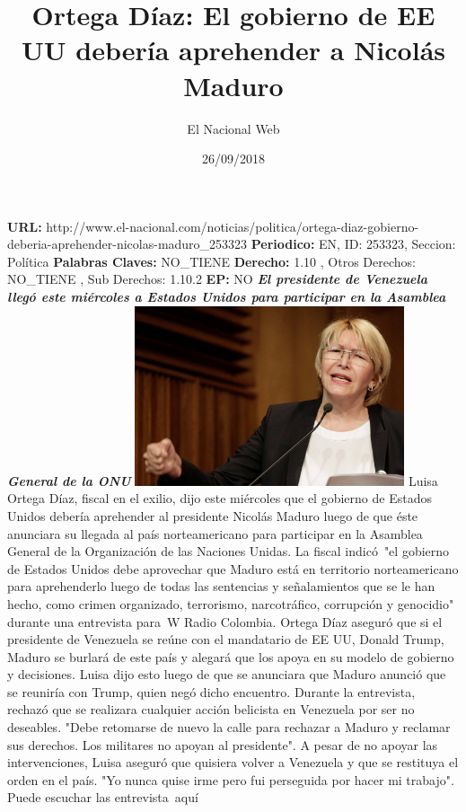 \documentclass{article}%
\title{\textbf{Ortega Díaz: El gobierno de EE UU debería aprehender a Nicolás Maduro}}%
\author{El Nacional Web}%
\date{26/09/2018}%
\begin{document}
%
\normalsize%
\maketitle%
\textbf{URL: }%
http://www.el{-}nacional.com/noticias/politica/ortega{-}diaz{-}gobierno{-}deberia{-}aprehender{-}nicolas{-}maduro\_253323\newline%
%
\textbf{Periodico: }%
EN, %
ID: %
253323, %
Seccion: %
Política\newline%
%
\textbf{Palabras Claves: }%
NO\_TIENE\newline%
%
\textbf{Derecho: }%
1.10%
, Otros Derechos: %
NO\_TIENE%
, Sub Derechos: %
1.10.2%
\newline%
%
\textbf{EP: }%
NO\newline%
\newline%
%
\textbf{\textit{El presidente de Venezuela llegó este miércoles a Estados Unidos para participar en la Asamblea General de la ONU}}%
\newline%
\newline%
%
\includegraphics[width=300px]{257.jpg}%
\newline%
%
Luisa Ortega Díaz, fiscal en el exilio, dijo este miércoles que el gobierno de Estados Unidos debería aprehender al presidente Nicolás Maduro luego de que éste anunciara su llegada al país norteamericano para participar en la Asamblea General de la Organización de las Naciones Unidas.%
\newline%
%
La fiscal indicó~"el gobierno de Estados Unidos debe aprovechar que Maduro está en territorio norteamericano para aprehenderlo luego de todas las sentencias y señalamientos que se le han hecho, como crimen organizado, terrorismo, narcotráfico, corrupción y genocidio" durante una entrevista para~W Radio Colombia.%
\newline%
%
Ortega Díaz aseguró que si el presidente de Venezuela se reúne con el mandatario de EE UU, Donald Trump, Maduro se burlará de este país y alegará que los apoya en su modelo de gobierno y decisiones. Luisa dijo esto luego de que se anunciara que Maduro anunció que se reuniría con Trump, quien negó dicho encuentro.%
\newline%
%
Durante la entrevista, rechazó que se realizara cualquier acción belicista en Venezuela por ser no deseables. "Debe retomarse de nuevo la calle para rechazar a Maduro y reclamar sus derechos. Los militares no apoyan al presidente".%
\newline%
%
A pesar de no apoyar las intervenciones, Luisa aseguró que quisiera volver a Venezuela y que se restituya el orden en el país. "Yo nunca quise irme pero fui perseguida por hacer mi trabajo".%
\newline%
%
Puede escuchar las entrevista~aquí%
\newline%
%
\end{document}
